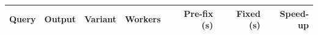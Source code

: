 \begin{tabular}{lllrrrr}
\toprule
Query & Output & Variant & Workers & Pre-fix (s) & Fixed (s) & Speed-up \\
\midrule

\bottomrule
\end{tabular}
